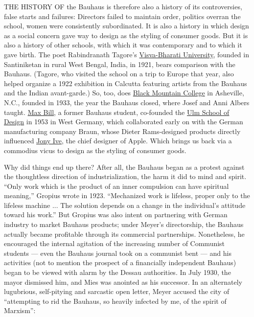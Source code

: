 THE HISTORY OF the Bauhaus is therefore also a history of its
controversies, false starts and failures: Directors failed to maintain
order, politics overran the school, women were consistently
subordinated. It is also a history in which design as a social concern
gave way to design as the styling of consumer goods. But it is also a
history of other schools, with which it was contemporary and to which it
gave birth. The poet Rabindranath Tagore's
\href{https://www.nytimes3xbfgragh.onion/2013/02/03/travel/where-a-poets-vision-lives-on-in-india.html}{Visva-Bharati
University}, founded in Santiniketan in rural West Bengal, India, in
1921, bears comparison with the Bauhaus. (Tagore, who visited the school
on a trip to Europe that year, also helped organize a 1922 exhibition in
Calcutta featuring artists from the Bauhaus and the Indian avant-garde.)
So, too, does
\href{https://www.nytimes3xbfgragh.onion/2015/12/18/arts/design/the-short-life-and-long-legacy-of-black-mountain-college.html}{Black
Mountain College} in Asheville, N.C., founded in 1933, the year the
Bauhaus closed, where Josef and Anni Albers taught.
\href{https://www.nytimes3xbfgragh.onion/1994/12/14/obituaries/max-bill-85-painter-sculptor-and-architect-in-austere-style.html}{Max
Bill}, a former Bauhaus student, co-founded the
\href{https://www.nytimes3xbfgragh.onion/1964/02/04/archives/ulm-school-carries-on-bauhaus-aims.html}{Ulm
School of Design} in 1953 in West Germany, which collaborated early on
with the German manufacturing company Braun, whose Dieter Rams-designed
products directly influenced
\href{https://www.nytimes3xbfgragh.onion/1998/02/05/garden/at-home-with-jonathan-ive-making-computers-cute-enough-to-wear.html}{Jony
Ive}, the chief designer of Apple. Which brings us back via a commodius
vicus to design as the styling of consumer goods.

Why did things end up there? After all, the Bauhaus began as a protest
against the thoughtless direction of industrialization, the harm it did
to mind and spirit. ``Only work which is the product of an inner
compulsion can have spiritual meaning,'' Gropius wrote in 1923.
``Mechanized work is lifeless, proper only to the lifeless machine ...
The solution depends on a change in the individual's attitude toward his
work.'' But Gropius was also intent on partnering with German industry
to market Bauhaus products; under Meyer's directorship, the Bauhaus
actually became profitable through its commercial partnerships.
Nonetheless, he encouraged the internal agitation of the increasing
number of Communist students --- even the Bauhaus journal took on a
communist bent --- and his activities (not to mention the prospect of a
financially independent Bauhaus) began to be viewed with alarm by the
Dessau authorities. In July 1930, the mayor dismissed him, and Mies was
anointed as his successor. In an alternately lugubrious, self-pitying
and sarcastic open letter, Meyer accused the city of ``attempting to rid
the Bauhaus, so heavily infected by me, of the spirit of Marxism'':

